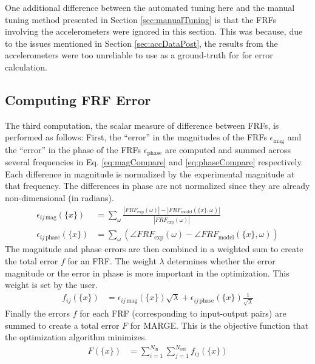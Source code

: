 One additional difference between the automated tuning here and the manual tuning method presented in Section \ref{sec:manualTuning} is that the FRFs involving the accelerometers were ignored in this section. This was because, due to the issues mentioned in Section \ref{sec:accDataPost}, the results from the accelerometers were too unreliable to use as a ground-truth for for error calculation.

\subsection{Computing FRF Error} %

The third computation, the scalar measure of difference between FRFs, is performed as follows:
First, the ``error'' in the magnitudes of the FRFs $\epsilon_\text{mag}$ and the ``error'' in the phase of the FRFs $\epsilon_\text{phase}$ are computed and summed across several frequencies in Eq. \ref{eq:magCompare} and \ref{eq:phaseCompare} respectively. Each difference in magnitude is normalized by the experimental magnitude at that frequency. The differences in phase are not normalized since they are already non-dimensional (in radians).
\begin{align}
	\label{eq:magCompare}
	\epsilon_{ij \, \text{mag}}(\{x\}) &= \sum_\omega \frac{|FRF_\text{exp} (\omega)| - |FRF_\text{model}(\{x\},\omega)|}{|FRF_\text{exp} (\omega)|} \\
	\label{eq:phaseCompare}
	\epsilon_{ij \, \text{phase}}(\{x\}) &= \sum_\omega \left( \angle FRF_\text{exp} (\omega) - \angle FRF_\text{model}(\{x\},\omega) \right)
\end{align}
The magnitude and phase errors are then combined in a weighted sum to create the total error $f$ for an FRF. The weight $\lambda$ determines whether the error magnitude or the error in phase is more important in the optimization. This weight is set by the user.
\begin{align}
	f_{ij}(\{x\}) &= \epsilon_{ij \, \text{mag}}(\{x\}) \sqrt{\lambda} + \epsilon_{ij \, \text{phase}}(\{x\}) \frac{1}{\sqrt{\lambda}}
\end{align}
Finally the errors $f$ for each FRF (corresponding to input-output pairs) are summed to create a total error $F$ for MARGE. This is the objective function that the optimization algorithm minimizes.
\begin{align}
	F(\{x\}) &= \sum_{i=1}^{N_\text{in}} \sum_{j=1}^{N_\text{out}} f_{ij}(\{x\})
\end{align}

